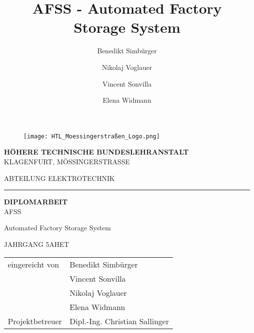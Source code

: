 \documentclass[12pt, twoside]{article}
\title{AFSS - Automated Factory Storage System}
\author{Benedikt Simbürger \\
    \and Nikolaj Voglauer \\
    \and Vincent Sonvilla \\
    \and Elena Widmann
    }
\begin{document}
\sloppy
{}

\setlength{\parindent}{0pt}

\begin{figure}[h]
    \vspace{-5mm}
    \texttt{[image: HTL\_Moessingerstraßen\_Logo.png]}
    \centering
\end{figure}

\begin{center}
    \Large \textbf{HÖHERE TECHNISCHE BUNDESLEHRANSTALT} \\
    \vspace{5mm}
    \Large{KLAGENFURT, MÖSSINGERSTRASSE}

\end{center}

\vspace{7mm}

\begin{center}
    \Large{ABTEILUNG ELEKTROTECHNIK}
\end{center}

\hrule

\vspace{10mm}

\begin{center}
    \Huge \textbf{DIPLOMARBEIT} \\
    \vspace{7mm}
    \huge{AFSS}

    \vspace{7mm}
    \huge{Automated Factory Storage System}

    \vspace{7mm}
    \Large{JAHRGANG 5AHET}

\end{center}

\vspace{15mm}

\begin{flushleft}
    \linespread{1}
    \bgroup
        \large
        \def\arraystretch{1.5}
        \begin{tabular}{p{5cm}l}
            eingereicht von & Benedikt Simbürger\\
            & Vincent Sonvilla\\
            & Nikolaj Voglauer\\
            & Elena Widmann\\
            Projektbetreuer & Dipl.-Ing. Christian Sallinger
        \end{tabular}
    \egroup
\end{flushleft}
\end{document}
